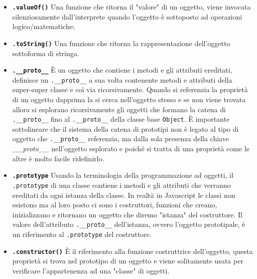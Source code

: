 \documentclass{sapthesis}
\newcommand{\bold}[1]{\textbf{#1}}
\newcommand{\code}[1]{\texttt{#1}}
\newcommand{\method}[1]{\code{.#1()}}
\newcommand{\attr}[1]{\code{.#1}}
\newcommand{\JS}{Javascript}
\begin{document}
        \begin{itemize}
            \item \bold{\method{valueOf}} Una funzione che ritorna il "valore" di un oggetto, viene invocata
                    silenziosamente dall'interprete quando l'oggetto è sottoposto ad operazioni logico/matematiche;

            \item \bold{\method{toString}} Una funzione che ritorna la rappresentazione dell'oggetto
                    sottoforma di stringa.

            \item \bold{\attr{\_\_proto\_\_}} È un oggetto che contiene i metodi e gli attributi ereditati, 
                    definisce un \attr{\_\_proto\_\_} a sua volta contenente metodi e attributi della super-super classe 
                    e coì via ricorsivamente. Quando si referenzia la proprietà di un oggetto dapprima la si cerca
                    nell'oggetto stesso e se non viene trovata allora si esplorano ricorsivamente gli oggetti che
                    formano la catena di \attr{\_\_proto\_\_} fino al \attr{\_\_proto\_\_} della classe
                    base \code{Object}. È importante sottolineare che il sistema della catena di prototipi non è
                    legato al tipo di oggetto che \attr{\_\_proto\_\_} referenzia, ma dalla sola presenza della chiave 
                    \textit{\_\_proto\_\_} nell'oggetto esplorato e poiché si tratta di una proprietà come le altre
                    è molto facile ridefinirlo.

            \item \bold{\attr{prototype}} Usando la terminologia della programmazione ad oggetti, il \attr{prototype}
                    di una classe contiene i metodi e gli attributi che verranno ereditati da ogni istanza della classe.
                    In realtà in \JS{} le classi non esistono ma al loro posto ci sono i costruttori, funzioni che creano,
                    inizializzano e ritornano un oggetto che diremo "istanza" del costruttore. Il valore dell'attributo \attr{\_\_proto\_\_}
                    dell'istanza, ovvero l'oggetto prototipale, è un riferimento al \attr{prototype} del costruttore.
            
            \item \bold{\method{constructor}} È il riferimento alla funzione costruttrice dell'oggetto, questa proprietà
                    si trova nel prototipo di un oggetto e viene solitamente usata per verificare l'appartenenza ad una
                    "classe" di oggetti.
        \end{itemize}
\end{document}
